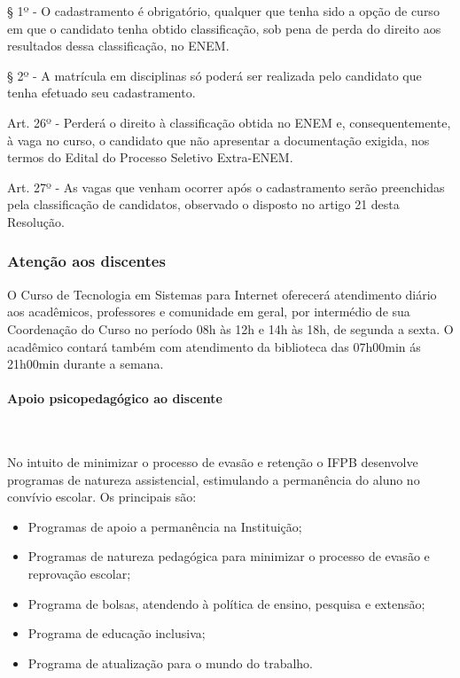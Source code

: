 § 1º - O cadastramento é obrigatório, qualquer que tenha sido a opção de curso em que o candidato tenha obtido classificação, sob pena de perda do direito aos resultados dessa classificação, no ENEM.

§ 2º - A matrícula em disciplinas só poderá ser realizada pelo candidato que tenha efetuado seu cadastramento.

Art. 26º - Perderá o direito à classificação obtida no ENEM e, consequentemente, à vaga no curso, o candidato que não apresentar a documentação exigida, nos termos do Edital do Processo Seletivo Extra-ENEM.

Art. 27º - As vagas que venham ocorrer após o cadastramento serão preenchidas pela classificação de candidatos, observado o disposto no artigo 21 desta Resolução.


\subsubsection{Aten\c{c}\~ao aos discentes}

O Curso de Tecnologia em Sistemas para Internet oferecerá atendimento diário aos acadêmicos, professores e comunidade em geral, por intermédio de sua Coordenação do Curso no período 08h às 12h e 14h às 18h, de segunda a sexta. O acadêmico contará também com atendimento da biblioteca das 07h00min ás 21h00min durante a semana.

\paragraph{Apoio psicopedagógico ao discente}\

       No intuito de minimizar o processo de evasão e retenção o IFPB desenvolve programas de natureza assistencial, estimulando a permanência do aluno no convívio escolar. Os principais são: 


\begin{itemize}
\item Programas de apoio a permanência na Instituição;

\item Programas de natureza pedagógica para minimizar o processo de evasão e reprovação escolar;

\item Programa de bolsas, atendendo à política de ensino, pesquisa e extensão;

\item Programa de educação inclusiva;

\item Programa de atualização para o mundo do trabalho.
\end{itemize}

